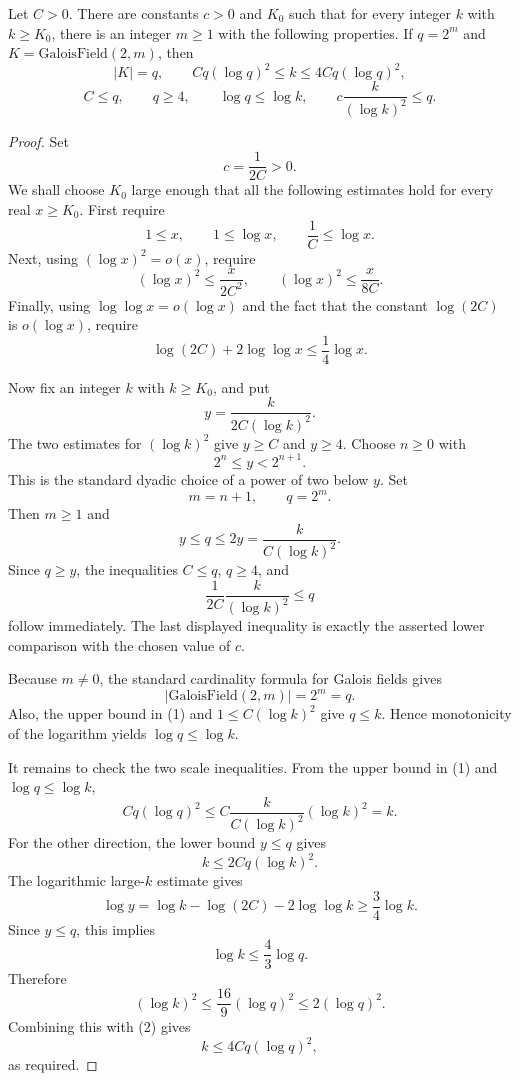 \begin{helper}
Let \(C>0\).  There are constants \(c>0\) and \(K_0\) such that for every
integer \(k\) with \(k\ge K_0\), there is an integer \(m\ge1\) with the
following properties.  If \(q=2^m\) and \(K=\mathrm{GaloisField}(2,m)\), then
\[
  |K|=q,\qquad Cq(\log q)^2\le k\le 4Cq(\log q)^2,
\]
\[
  C\le q,\qquad q\ge4,\qquad \log q\le\log k,\qquad
  c\frac{k}{(\log k)^2}\le q .
\]
\end{helper}
\begin{proof}
Set
\[
  c=\frac1{2C}>0.
\]
We shall choose \(K_0\) large enough that all the following estimates hold
for every real \(x\ge K_0\).  First require
\[
  1\le x,\qquad 1\le\log x,\qquad \frac1C\le\log x.
\]
Next, using \((\log x)^2=o(x)\), require
\[
  (\log x)^2\le \frac{x}{2C^2},
  \qquad
  (\log x)^2\le \frac{x}{8C}.
\]
Finally, using \(\log\log x=o(\log x)\) and the fact that the constant
\(\log(2C)\) is \(o(\log x)\), require
\[
  \log(2C)+2\log\log x\le \frac14\log x.
\]

Now fix an integer \(k\) with \(k\ge K_0\), and put
\[
  y=\frac{k}{2C(\log k)^2}.
\]
The two estimates for \((\log k)^2\) give \(y\ge C\) and \(y\ge4\).  Choose
\(n\ge0\) with
\[
  2^n\le y<2^{n+1}.
\]
This is the standard dyadic choice of a power of two below \(y\).  Set
\[
  m=n+1,\qquad q=2^m.
\]
Then \(m\ge1\) and
\[
  y\le q\le2y=\frac{k}{C(\log k)^2}. \tag{1}
\]
Since \(q\ge y\), the inequalities \(C\le q\), \(q\ge4\), and
\[
  \frac1{2C}\frac{k}{(\log k)^2}\le q
\]
follow immediately.  The last displayed inequality is exactly the asserted
lower comparison with the chosen value of \(c\).

Because \(m\ne0\), the standard cardinality formula for Galois fields gives
\[
  |\mathrm{GaloisField}(2,m)|=2^m=q.
\]
Also, the upper bound in (1) and \(1\le C(\log k)^2\) give \(q\le k\).  Hence
monotonicity of the logarithm yields \(\log q\le\log k\).

It remains to check the two scale inequalities.  From the upper bound in
(1) and \(\log q\le\log k\),
\[
  Cq(\log q)^2
  \le C\frac{k}{C(\log k)^2}(\log k)^2
  = k.
\]
For the other direction, the lower bound \(y\le q\) gives
\[
  k\le 2Cq(\log k)^2. \tag{2}
\]
The logarithmic large-\(k\) estimate gives
\[
  \log y
  =\log k-\log(2C)-2\log\log k
  \ge \frac34\log k.
\]
Since \(y\le q\), this implies
\[
  \log k\le \frac43\log q.
\]
Therefore
\[
  (\log k)^2\le \frac{16}{9}(\log q)^2\le2(\log q)^2.
\]
Combining this with (2) gives
\[
  k\le4Cq(\log q)^2,
\]
as required.
\end{proof}
